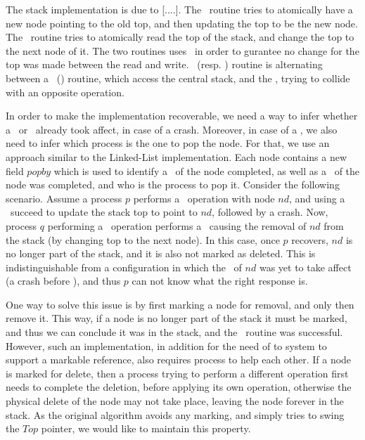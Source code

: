 The stack implementation is due to [....]. The \trypush\ routine tries to atomically have a new node pointing to the old top, and then updating the top to be the new node. The \trypop\ routine tries to atomically read the top of the stack, and change the top to the next node of it. The two routines uses \CAS\ in order to gurantee no change for the top was made between the read and write.
\push\ (resp. \pop) routine is alternating between a \trypush\ (\trypop) routine, which access the central stack, and the \exchange, trying to collide with an opposite operation.

In order to make the implementation recoverable, we need a way to infer whether a \pop\ or \push\ already took affect, in case of a crash. Moreover, in case of a \pop, we also need to infer which process is the one to pop the node. For that, we use an approach similar to the Linked-List implementation. Each node contains a new field $popby$ which is used to identify a \push\ of the node completed, as well as a \pop\ of the node was completed, and who is the process to pop it.
Consider the following scenario. Assume a process $p$ performs a \push\ operation with node $nd$, and using a \CAS\ succeed to update the stack top to point to $nd$, followed by a crash. Now, process $q$ performing a \pop\ operation performs a \CAS\ causing the removal of $nd$ from the stack (by changing top to the next node). In this case, once $p$ recovers, $nd$ is no longer part of the stack, and it is also not marked as deleted. This is indistinguishable from a configuration in which the \push\ of $nd$ was yet to take affect (a crash before \CAS), and thus $p$ can not know what the right response is.

One way to solve this issue is by first marking a node for removal, and only then remove it. This way, if a node is no longer part of the stack it must be marked, and thus we can conclude it was in the stack, and the \push\ routine was successful. However, such an implementation, in addition for the need of to system to support a markable reference, also requires process to help each other. If a node is marked for delete, then a process trying to perform a different operation first needs to complete the deletion, before applying its own operation, otherwise the physical delete of the node may not take place, leaving the node forever in the stack. As the original algorithm avoids any marking, and simply tries to swing the $Top$ pointer, we would like to maintain this property.

